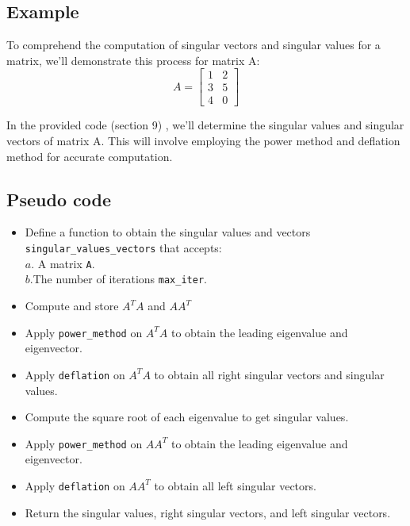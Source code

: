 \documentclass[11pt]{article}
\begin{document}
\subsection{Example}
To comprehend the computation of singular vectors and singular values for a matrix, we'll demonstrate this process for matrix A:
\[ A = \begin{bmatrix} 1 & 2 \\ 3 & 5 \\ 4 & 0 \end{bmatrix} \]

In the provided code (section 9) , we'll determine the singular values and singular vectors of matrix A. This will involve employing the power method and deflation method for accurate computation.


\subsection{Pseudo code}
\begin{itemize}
    \item Define a function to obtain the singular values and vectors \texttt{singular\_values\_vectors} that accepts:\\
    $a. $ A matrix \texttt{A}.\\
    $b. $The number of iterations \texttt{max\_iter}.
    \item Compute and store \( A^TA \) and \( AA^T \)
    \item Apply \texttt{power\_method} on \( A^TA \) to obtain the leading eigenvalue and eigenvector.
    \item Apply \texttt{deflation} on \( A^TA \) to obtain all right singular vectors and singular values.
    \item Compute the square root of each eigenvalue to get singular values.
    \item Apply \texttt{power\_method} on \( AA^T \) to obtain the leading eigenvalue and eigenvector.
    \item Apply \texttt{deflation} on \( AA^T \) to obtain all left singular vectors.
    \item Return the singular values, right singular vectors, and left singular vectors.
\end{itemize}

\newpage
\end{document}
